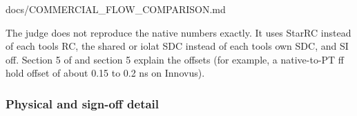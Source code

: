\begin{relocated}{docs/COMMERCIAL_FLOW_COMPARISON.md}
{}

The judge does not reproduce the native numbers exactly. It uses StarRC
instead of each tool\textquotesingle s RC, the shared or iolat SDC
instead of each tool\textquotesingle s own SDC, and SI off. Section 5 of
 and
 section 5 explain the offsets (for
example, a native-to-PT ff hold offset of about 0.15 to 0.2 ns on
Innovus).

\subsubsection{Physical and sign-off detail}\label{tm:pd:commercial-flow-comparison:46-physical-and-sign-off-detail}

{\footnotesize\setlength{\tabcolsep}{3pt}

}
\end{relocated}
